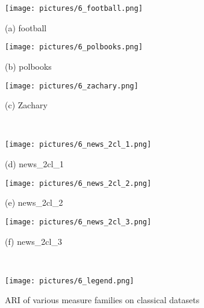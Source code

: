 \documentclass{article}
\begin{document}
\begin{figure}[H]
	\begin{minipage}{.32\textwidth}
		\texttt{[image: pictures/6\_football.png]}
		\\\centerline{(a) football}
	\end{minipage}
	\begin{minipage}{.32\textwidth}
		\texttt{[image: pictures/6\_polbooks.png]}
		\\\centerline{(b) polbooks}
	\end{minipage}
	\begin{minipage}{.32\textwidth}
		\texttt{[image: pictures/6\_zachary.png]}
		\\\centerline{(c) Zachary}
	\end{minipage}
    \\[10pt]
	\begin{minipage}{.32\textwidth}
		\texttt{[image: pictures/6\_news\_2cl\_1.png]}
		\\\centerline{(d) news\_2cl\_1}
	\end{minipage}
	\begin{minipage}{.32\textwidth}
		\texttt{[image: pictures/6\_news\_2cl\_2.png]}
		\\\centerline{(e) news\_2cl\_2}
	\end{minipage}
	\begin{minipage}{.32\textwidth}
		\texttt{[image: pictures/6\_news\_2cl\_3.png]}
		\\\centerline{(f) news\_2cl\_3}
	\end{minipage}
	\\[10pt]
    \begin{minipage}{\textwidth}
        \texttt{[image: pictures/6\_legend.png]}
	\end{minipage}
  \caption{\label{f_datasets}ARI of various measure families on classical datasets}
\end{figure}
\end{document}
